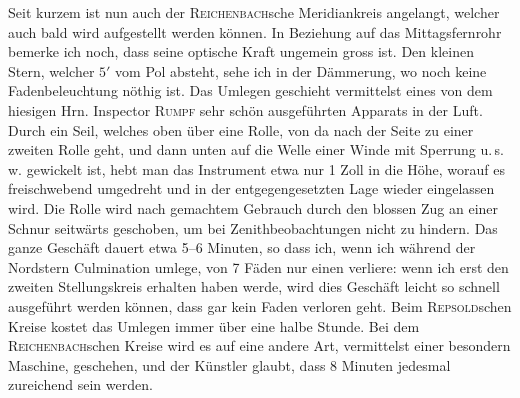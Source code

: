 \par\indent Seit kurzem ist nun auch der \textsc{Reichenbach}sche Meridiankreis angelangt, welcher auch bald wird aufgestellt werden können. In Beziehung auf das Mittagsfernrohr bemerke ich noch, dass seine optische Kraft ungemein gross ist. Den kleinen Stern, welcher $5'$ vom Pol absteht, sehe ich in der Dämmerung, wo noch keine Fadenbeleuchtung nöthig ist. Das Umlegen geschieht vermittelst eines von dem hiesigen Hrn. Inspector \textsc{Rumpf} sehr schön ausgeführten Apparats in der Luft. Durch ein Seil, welches oben über eine Rolle, von da nach der Seite zu einer zweiten Rolle geht, und dann unten auf die Welle einer Winde mit Sperrung u.\,s.\,w. gewickelt ist, hebt man das Instrument etwa nur 1 Zoll in die Höhe, worauf es freischwebend umgedreht und in der entgegengesetzten Lage wieder eingelassen wird. Die Rolle wird nach gemachtem Gebrauch durch den blossen Zug an einer Schnur seitwärts geschoben, um bei Zenithbeobachtungen nicht zu hindern. Das ganze Geschäft dauert etwa 5--6 Minuten, so dass ich, wenn ich während der Nordstern Culmination umlege, von 7 Fäden nur einen verliere: wenn ich erst den zweiten Stellungskreis erhalten haben werde, wird dies Geschäft leicht so schnell ausgeführt werden können, dass gar kein Faden verloren geht. Beim \textsc{Repsold}schen Kreise kostet das Umlegen immer über eine halbe Stunde. Bei dem \textsc{Reichenbach}schen Kreise wird es auf eine andere Art, vermittelst einer besondern Maschine, geschehen, und der Künstler glaubt, dass 8 Minuten jedesmal zureichend sein werden.
